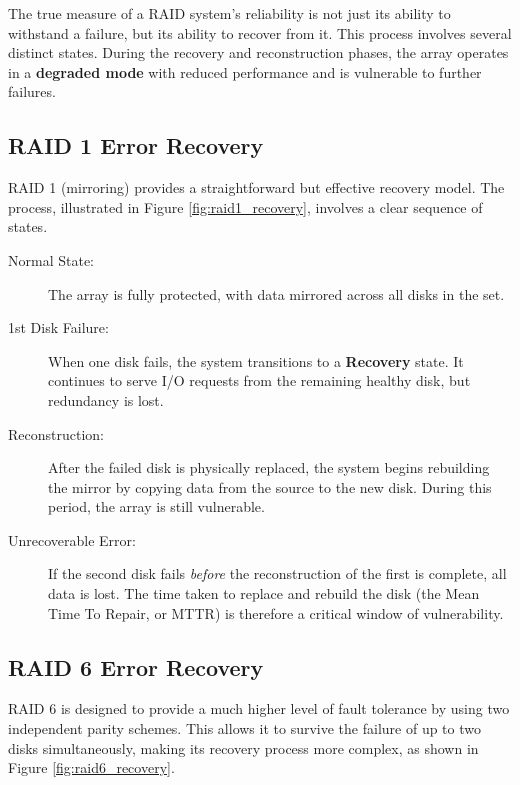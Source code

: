 The true measure of a RAID system's reliability is not just its ability to withstand a failure, but its ability to recover from it. This process involves several distinct states. During the recovery and reconstruction phases, the array operates in a \textbf{degraded mode} with reduced performance and is vulnerable to further failures.

\subsection{RAID 1 Error Recovery}

RAID 1 (mirroring) provides a straightforward but effective recovery model. The process, illustrated in Figure \ref{fig:raid1_recovery}, involves a clear sequence of states.


\begin{description}
    \item[Normal State:] The array is fully protected, with data mirrored across all disks in the set.
    \item[1st Disk Failure:] When one disk fails, the system transitions to a \textbf{Recovery} state. It continues to serve I/O requests from the remaining healthy disk, but redundancy is lost.
    \item[Reconstruction:] After the failed disk is physically replaced, the system begins rebuilding the mirror by copying data from the source to the new disk. During this period, the array is still vulnerable.
    \item[Unrecoverable Error:] If the second disk fails \textit{before} the reconstruction of the first is complete, all data is lost. The time taken to replace and rebuild the disk (the Mean Time To Repair, or MTTR) is therefore a critical window of vulnerability.
\end{description}

\subsection{RAID 6 Error Recovery}

RAID 6 is designed to provide a much higher level of fault tolerance by using two independent parity schemes. This allows it to survive the failure of up to two disks simultaneously, making its recovery process more complex, as shown in Figure \ref{fig:raid6_recovery}.

